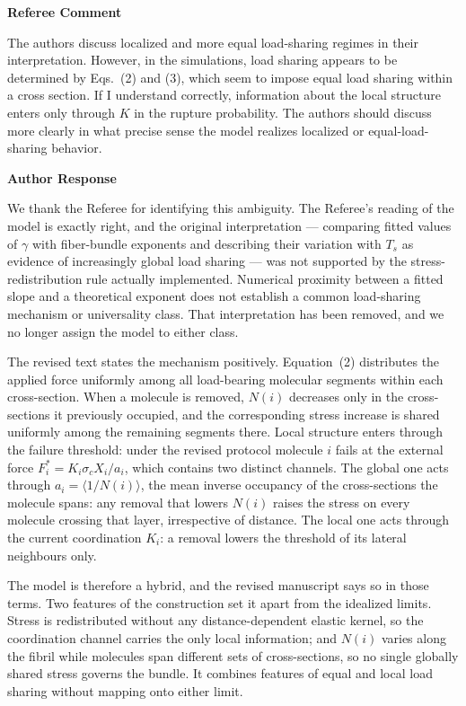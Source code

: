 \documentclass[11pt]{article}
\newenvironment{refereecomment}
  {%
    \par
    \begingroup
    \color{commentgray}
    \itshape
    \setlength{\leftskip}{1.4em}
    \setlength{\rightskip}{1.4em}
  }
  {%
    \par
    \endgroup
  }
\newcommand{\refereelabel}{%
  \par\smallskip
  {\color{commentgray}\bfseries Referee Comment}\par
}
\newcommand{\responselabel}{%
  \par\medskip
  {\color{responseblue}\bfseries Author Response}\par
}
\begin{document}
\refereelabel
\begin{refereecomment}
  The authors discuss localized and more equal load-sharing regimes in their
  interpretation. However, in the simulations, load sharing appears to be
  determined by Eqs.~(2) and (3), which seem to impose equal load sharing within
  a cross section. If I understand correctly, information about the local
  structure enters only through \(K\) in the rupture probability. The authors
  should discuss more clearly in what precise sense the model realizes localized
  or equal-load-sharing behavior.
\end{refereecomment}

\responselabel

We thank the Referee for identifying this ambiguity. The Referee's reading of
the model is exactly right, and the original interpretation --- comparing fitted
values of $\gamma$ with fiber-bundle exponents and describing their variation
with $T_s$ as evidence of increasingly global load sharing --- was not supported
by the stress-redistribution rule actually implemented. Numerical proximity
between a fitted slope and a theoretical exponent does not establish a common
load-sharing mechanism or universality class. That interpretation has been
removed, and we no longer assign the model to either class.

The revised text states the mechanism positively. Equation~(2) distributes the
applied force uniformly among all load-bearing molecular segments within each
cross-section. When a molecule is removed, $N(i)$ decreases only in the
cross-sections it previously occupied, and the corresponding stress increase is
shared uniformly among the remaining segments there. Local structure enters
through the failure threshold: under the revised protocol molecule $i$ fails at
the external force $F^{*}_i = K_i\sigma_c X_i/a_i$, which contains two distinct
channels. The global one acts through $a_i=\langle 1/N(i)\rangle$, the mean
inverse occupancy of the cross-sections the molecule spans: any removal that
lowers $N(i)$ raises the stress on every molecule crossing that layer,
irrespective of distance. The local one acts through the current coordination
$K_i$: a removal lowers the threshold of its lateral neighbours only.

The model is therefore a hybrid, and the revised manuscript says so in those
terms. Two features of the construction set it apart from the idealized limits.
Stress is redistributed without any distance-dependent elastic kernel, so the
coordination channel carries the only local information; and $N(i)$ varies along
the fibril while molecules span different sets of cross-sections, so no single
globally shared stress governs the bundle. It combines features of equal and
local load sharing without mapping onto either limit.
\end{document}
